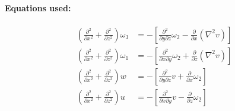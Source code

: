 \documentclass[titlepage,12pt,letter]{article}
\newcommand{\p}{\partial}
\newcommand{\paren}[1]{\left( #1 \right)}
\newcommand{\bracket}[1]{\left[ #1 \right]}
\numberwithin{equation}{section}
\begin{document}
\newpage
\paragraph{Equations used:}
\begin{align}
	\paren{\frac{\p^2}{\p x^2}+\frac{\p^2}{\p z^2}} \omega_3  &= -\bracket{\frac{\p^2 }{\p y \p z} \omega_2 - \frac{\p}{\p x}\paren{\nabla^2 v}} \label{eq:om3}\\
	\paren{\frac{\p^2}{\p x^2}+\frac{\p^2}{\p z^2}} \omega_1  &= -\bracket{\frac{\p^2 }{\p x \p y } \omega_2 + \frac{\p}{\p z}\paren{\nabla^2 v}} \label{eq:om1}\\
	\paren{\frac{\p^2}{\p x^2}+\frac{\p^2}{\p z^2}} w  &= -\bracket{\frac{\p^2 }{\p y \p z} v + \frac{\p}{\p x}\omega_2} \label{eq:w}\\
	\paren{\frac{\p^2}{\p x^2}+\frac{\p^2}{\p z^2}} u  &= -\bracket{\frac{\p^2 }{\p x \p y} v - \frac{\p}{\p z}\omega_2} \label{eq:u}
\end{align}
\end{document}

